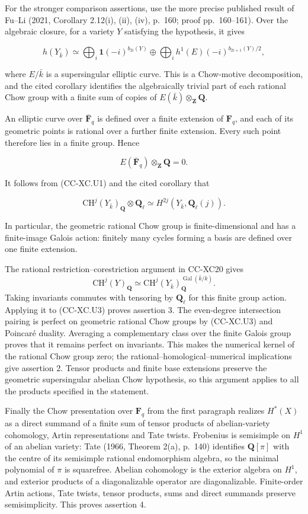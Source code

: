 For the stronger comparison assertions, use the more precise published
result of Fu--Li (2021, Corollary 2.12(i), (ii), (iv), p.~160; proof
pp.~160--161). Over the algebraic closure, for a variety \(Y\)
satisfying the hypothesis, it gives

\[
 h(Y_{\bar k})\simeq
 \bigoplus_i\mathbf1(-i)^{b_{2i}(Y)}
 \oplus
 \bigoplus_i h^1(E)(-i)^{b_{2i+1}(Y)/2},
\tag{CC-XC.U1}
\]

where \(E/\bar k\) is a supersingular elliptic curve. This is a
Chow-motive decomposition, and the cited corollary identifies the
algebraically trivial part of each rational Chow group with a finite sum
of copies of \(E(\bar k)\otimes_{\mathbf Z}\mathbf Q\).

An elliptic curve over \(\bar{\mathbf F}_q\) is defined over a finite
extension of \(\mathbf F_q\), and each of its geometric points is
rational over a further finite extension. Every such point therefore
lies in a finite group. Hence

\[
               E(\bar{\mathbf F}_q)\otimes_{\mathbf Z}\mathbf Q=0.
\tag{CC-XC.U2}
\]

It follows from (CC-XC.U1) and the cited corollary that

\[
 \mathrm{CH}^j(Y_{\bar k})_{\mathbf Q}\otimes\mathbf Q_\ell
          \simeq H^{2j}(Y_{\bar k},\mathbf Q_\ell(j)).
\tag{CC-XC.U3}
\]

In particular, the geometric rational Chow group is finite-dimensional
and has a finite-image Galois action: finitely many cycles forming a
basis are defined over one finite extension.

The rational restriction--corestriction argument in CC-XC20 gives \[
 \mathrm{CH}^j(Y)_{\mathbf Q}
     \simeq \mathrm{CH}^j(Y_{\bar k})_{\mathbf Q}^{\operatorname{Gal}(\bar k/k)}.
\tag{CC-XC.U4}
\] Taking invariants commutes with tensoring by \(\mathbf Q_\ell\) for
this finite group action. Applying it to (CC-XC.U3) proves assertion 3.
The even-degree intersection pairing is perfect on geometric rational
Chow groups by (CC-XC.U3) and Poincaré duality. Averaging a
complementary class over the finite Galois group proves that it remains
perfect on invariants. This makes the numerical kernel of the rational
Chow group zero; the rational--homological--numerical implications give
assertion 2. Tensor products and finite base extensions preserve the
geometric supersingular abelian Chow hypothesis, so this argument
applies to all the products specified in the statement.

Finally the Chow presentation over \(\mathbf F_q\) from the first
paragraph realizes \(H^*(X)\) as a direct summand of a finite sum of
tensor products of abelian-variety cohomology, Artin representations and
Tate twists. Frobenius is semisimple on \(H^1\) of an abelian variety:
Tate (1966, Theorem 2(a), p.~140) identifies \(\mathbf Q[\pi]\) with the
centre of its semisimple rational endomorphism algebra, so the minimal
polynomial of \(\pi\) is squarefree. Abelian cohomology is the exterior
algebra on \(H^1\), and exterior products of a diagonalizable operator
are diagonalizable. Finite-order Artin actions, Tate twists, tensor
products, sums and direct summands preserve semisimplicity. This proves
assertion 4.


